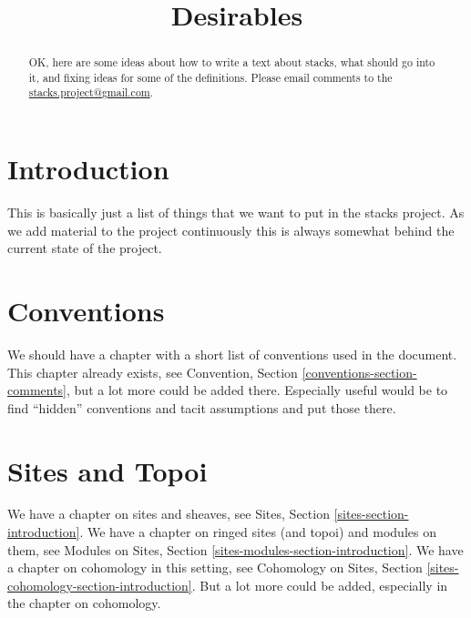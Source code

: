 

%


\title{Desirables}

\begin{abstract}
OK, here are some ideas about how to write a text about
stacks, what should go into it, and fixing ideas for some
of the definitions. Please email comments to the
\href{mailto:stacks.project@gmail.com}{stacks.project@gmail.com}.
\end{abstract}

\maketitle

\label{section-phantom}


\tableofcontents

\section{Introduction}
\label{section-introduction}

\noindent
This is basically just a list of things that we want to put in the stacks
project. As we add material to the project continuously this is always
somewhat behind the current state of the project.


\section{Conventions}
\label{section-conventions}

\noindent
We should have a chapter with a short list of conventions used in the document.
This chapter already exists, see
Convention, Section \ref{conventions-section-comments},
but a lot more could be added there. Especially useful would be to find
``hidden'' conventions and tacit assumptions and put those there.


\section{Sites and Topoi}
\label{section-sites}

\noindent
We have a chapter on sites and sheaves, see
Sites, Section \ref{sites-section-introduction}.
We have a chapter on ringed sites (and topoi) and modules on them, see
Modules on Sites, Section \ref{sites-modules-section-introduction}.
We have a chapter on cohomology in this setting, see
Cohomology on Sites, Section \ref{sites-cohomology-section-introduction}.
But a lot more could be added, especially in the chapter on cohomology.


